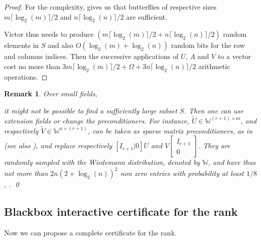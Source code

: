 \documentclass{article}
\newcommand{\customlinebreak}{}
\newtheorem{remark}{Remark}
\newcommand{\W}{\ensuremath{\mathbb W}}
\newcommand{\bigO}[1]{\ensuremath{O(#1)}\xspace}
\begin{document}
\begin{proof}
  For the complexity, \cite[Theorem 6.2]{Chen:2002:EMP} gives us that
  butterflies of respective sizes $m\lceil\log_2(m)\rceil/2$ and
  $n\lceil\log_2(n)\rceil/2$ are sufficient. 
   
  Victor thus needs to produce
  $(m\lceil\log_2(m)\rceil/2 + n\lceil\log_2(n)\rceil/2)$ random
  elements in $S$ and also $\bigO{\log_2(m)+\log_2(n)}$ random bits
  for the row and columns indices. 
  Then the successive applications of $U$, $A$ and $V$ to a vector cost no more
  than $3m\lceil\log_2(m)\rceil/2+\Omega+3n\lceil\log_2(n)\rceil/2$ arithmetic operations.
\end{proof}

\begin{remark}
{\upshape 
  Over small fields, 
   
  it might not be possible to find a sufficiently large subset $S$. 
  Then one can use extension fields or change the preconditioners.
  For instance, $\tilde{U}\in\W^{(r+1)\times m}$, and respectively
  $\tilde{V}\in\W^{n\times (r+1)}$, can be taken as sparse matrix preconditioners, as in
  \cite{Wiedemann:1986:SSLE} (see also \cite[Corollary 7.3]{Chen:2002:EMP}), and
  replace respectively $\left[ I_{r+1}|0 \right] U$ and $V
  \ensuremath{\left[\begin{array}{cc}I_{r+1}\\0\end{array} \right]}$.
  They are randomly sampled with the 
  Wiedemann distribution, denoted by $\W$, and have thus not more than
  $2n(2+\log_2(n))^2$ non zero entries with probability at least $1/8$,
  \cite[Theorem 1]{Wiedemann:1986:SSLE}. 
\qed} 
\end{remark}


\subsection{Blackbox interactive certificate for the{\customlinebreak} rank}  
Now we can propose a complete certificate for the rank. 
 
\end{document}
